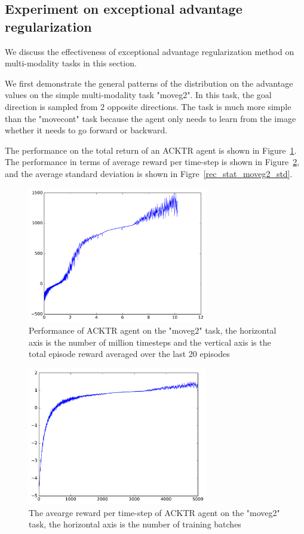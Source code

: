 \subsection{Experiment on exceptional advantage regularization}
We discuss the effectiveness of exceptional advantage regularization method on multi-modality tasks in this section.

We first demonstrate the general patterns of the distribution on the advantage values on the simple multi-modality task "moveg2". In this task, the goal direction is sampled from 2 opposite directions. The task is much more simple than the "movecont" task because the agent only needs to learn from the image whether it needs to go forward or backward. 

The performance on the total return of an ACKTR agent is shown in Figure~\ref{rec_stat_moveg2}. The performance in terms of average reward per time-step is shown in Figure~\ref{rec_stat_moveg2_meanrt}, and the average standard deviation is shown in Figre~\ref{rec_stat_moveg2_std}.


\begin{figure}[!htbp]
	\includegraphics[width=0.7\textwidth]{images/rec_stat_moveg2.pdf}
	\centering
	\caption{Performance of ACKTR agent on the "moveg2" task, the horizontal axis is the number of million timesteps and the vertical axis is the total episode reward averaged over the last 20 episodes}\label{rec_stat_moveg2}
\end{figure}

\begin{figure}[!htbp]
	\includegraphics[width=0.7\textwidth]{images/rec_stat_moveg2_meanrt.pdf}
	\centering
	\caption{The avearge reward per time-step of ACKTR agent on the "moveg2" task, the horizontal axis is the number of training batches}\label{rec_stat_moveg2_meanrt}
\end{figure}

